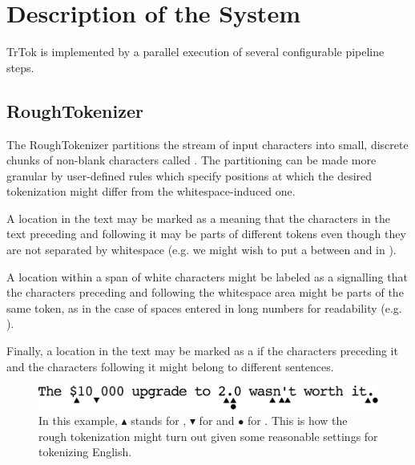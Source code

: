 \section{Description of the System}
\label{sec:system}

TrTok is implemented by a parallel execution of several configurable
pipeline steps.

\subsection{RoughTokenizer}

The RoughTokenizer partitions the stream of input characters into
small, discrete chunks of non-blank characters called . The partitioning can be made more granular by user-defined
rules which specify positions at which the desired tokenization might
differ from the whitespace-induced one.

A location in the text may be marked as a \maysplit{} meaning that the
characters in the text preceding and following it may be parts of
different tokens even though they are not separated by whitespace
(e.g. we might wish to put a \maysplit{} between  and
 in ).

A location within a span of white characters might be labeled as a
\mayjoin{} signalling that the characters preceding and following the
whitespace area might be parts of the same token, as in the case of
spaces entered in long numbers for readability (e.g.
).

Finally, a location in the text may be marked as a \maybreaksentence{}
if the characters preceding it and the characters following it might
belong to different sentences.

\begin{figure}
  \begin{center}
    \includegraphics[width=\textwidth / 2]{img/decisionpoints.eps}
    \caption{In this example, $\blacktriangle$ stands for \maysplit{},
      $\blacktriangledown$ for \mayjoin{} and $\bullet$ for
      \maybreaksentence{}. This is how the rough tokenization might
      turn out given some reasonable settings for tokenizing English.}
    \label{fig:decision-points}
  \end{center}
\end{figure}

